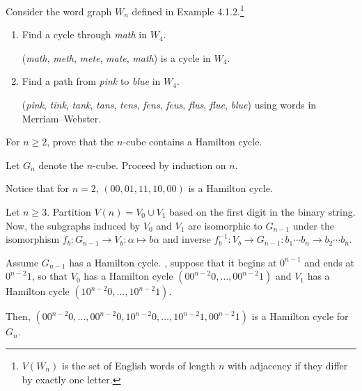 \documentclass[class=math239,notes,tikz]{agony}
\begin{document}
\begin{xca}
  Consider the word graph $W_n$ defined in Example 4.1.2.\footnote{
    $V(W_n)$ is the set of English words of length $n$
    with adjacency if they differ by exactly one letter.}
\end{xca}
\begin{enumerate}
  \item Find a cycle through \emph{math} in $W_4$.
        \begin{sol}
          (\emph{math}, \emph{meth}, \emph{mete}, \emph{mate}, \emph{math})
          is a cycle in $W_4$.
        \end{sol}
  \item Find a path from \emph{pink} to \emph{blue} in $W_4$.
        \begin{sol}
          (\emph{pink}, \emph{tink}, \emph{tank}, \emph{tans}, \emph{tens}, \emph{fens}, \emph{feus}, \emph{flus}, \emph{flue}, \emph{blue})
          using words in Merriam--Webster.
        \end{sol}
\end{enumerate}

\begin{xca}
  For $n \geq 2$, prove that the $n$-cube contains a Hamilton cycle.
\end{xca}
\begin{prf}
  Let $G_n$ denote the $n$-cube. Proceed by induction on $n$.

  Notice that for $n = 2$, $(00,01,11,10,00)$ is a Hamilton cycle.

  Let $n \geq 3$.
  Partition $V(n) = V_0 \cup V_1$ based on the first digit in the binary string.
  Now, the subgraphs induced by $V_0$ and $V_1$ are isomorphic to $G_{n-1}$
  under the isomorphism $f_b : G_{n-1} \to V_b : \alpha \mapsto b\alpha$
  and inverse $f^{-1}_b : V_b \to G_{n-1} : b_1\cdots b_n \to b_2 \cdots b_n$.

  Assume $G_{n-1}$ has a Hamilton cycle.
  \WLOG, suppose that it begins at $0^{n-1}$ and ends at $0^{n-2}1$,
  so that $V_0$ has a Hamilton cycle $(00^{n-2}0, \dotsc, 00^{n-2}1)$
  and $V_1$ has a Hamilton cycle $(10^{n-2}0, \dotsc, 10^{n-2}1)$.

  Then, $(00^{n-2}0, \dotsc, 00^{n-2}0, 10^{n-2}0, \dotsc, 10^{n-2}1, 00^{n-2}1)$
  is a Hamilton cycle for $G_n$.
\end{prf}
\end{document}
